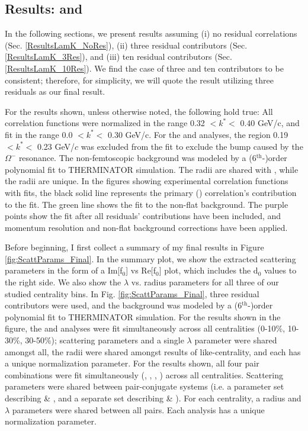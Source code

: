 \documentclass[../AnalysisNoteJBuxton.tex]{subfiles}
\begin{document}
\subsection{Results: \LamKs and \LamKpm}
\label{ResultsLamK}

In the following sections, we present results assuming (i) no residual correlations (Sec. \ref{ResultsLamK_NoRes}), (ii) three residual contributors (Sec. \ref{ResultsLamK_3Res}), and (iii) ten residual contributors (Sec. \ref{ResultsLamK_10Res}).  We find the case of three and ten contributors to be consistent; therefore, for simplicity, we will quote the result utilizing three residuals as our final result.

For the results shown, unless otherwise noted, the following hold true:
All correlation functions were normalized in the range 0.32 $< k^{*} <$ 0.40 GeV/c, and fit in the range 0.0 $< k^{*} <$ 0.30 GeV/c.
For the \LamKchM and \ALamKchP analyses, the region 0.19 $< k^{*} <$ 0.23 GeV/$c$ was excluded from the fit to exclude the bump caused by the $\Omega^{-}$ resonance.
The non-femtoscopic background was modeled by a (6$^{\mathrm{th}}$-)order polynomial fit to THERMINATOR simulation.
The \LamKchPALamKchM radii are shared with \LamKchMALamKchP, while the \LamKsALamKs radii are unique.
In the figures showing experimental correlation functions with fits, the black solid line represents the primary (\LamK) correlation's contribution to the fit.
The green line shows the fit to the non-flat background.  
The purple points show the fit after all residuals' contributions have been included, and momentum resolution and non-flat background corrections have been applied.


Before beginning, I first collect a summary of my final results in Figure \ref{fig:ScattParams_Final}.  
In the summary plot, we show the extracted scattering parameters in the form of a Im[f$_{0}$] vs Re[f$_{0}$] plot, which includes the d$_{0}$ values to the right side.  
We also show the $\lambda$ vs. radius parameters for all three of our studied centrality bins.  
In Fig. \ref{fig:ScattParams_Final}, three residual contributors were used, and the background was modeled by a (6$^{\mathrm{th}}$-)order polynomial fit to THERMINATOR simulation.  
For the \LamKs results shown in the figure, the \LamKs and \ALamKs analyses were fit simultaneously across all centralities (0-10\%, 10-30\%, 30-50\%); scattering parameters and a single $\lambda$ parameter were shared amongst all, the radii were shared amongst results of like-centrality, and each has a unique normalization parameter.  
For the \LamKpm results shown, all four pair combinations were fit simultaneously (\LamKchP, \ALamKchM, \LamKchM, \ALamKchP) across all centralities.  
Scattering parameters were shared between pair-conjugate systems (i.e. a parameter set describing \LamKchP \& \ALamKchM, and a separate set describing \LamKchM \& \ALamKchP).  
For each centrality, a radius and $\lambda$ parameters were shared between all pairs.  Each analysis has a unique normalization parameter.
\end{document}

